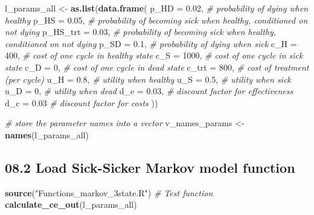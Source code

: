 \documentclass[
]{article}
\newenvironment{Shaded}{\begin{snugshade}}{\end{snugshade}}
\newcommand{\CommentTok}[1]{\textcolor[rgb]{0.56,0.35,0.01}{\textit{#1}}}
\newcommand{\DataTypeTok}[1]{\textcolor[rgb]{0.13,0.29,0.53}{#1}}
\newcommand{\DecValTok}[1]{\textcolor[rgb]{0.00,0.00,0.81}{#1}}
\newcommand{\FloatTok}[1]{\textcolor[rgb]{0.00,0.00,0.81}{#1}}
\newcommand{\KeywordTok}[1]{\textcolor[rgb]{0.13,0.29,0.53}{\textbf{#1}}}
\newcommand{\NormalTok}[1]{#1}
\newcommand{\StringTok}[1]{\textcolor[rgb]{0.31,0.60,0.02}{#1}}
\begin{document}
\begin{Shaded}
\begin{Highlighting}[]
\NormalTok{l_params_all <-}\StringTok{ }\KeywordTok{as.list}\NormalTok{(}\KeywordTok{data.frame}\NormalTok{(}
  \DataTypeTok{p_HD     =} \FloatTok{0.02}\NormalTok{,  }\CommentTok{# probability of dying when healthy}
  \DataTypeTok{p_HS     =} \FloatTok{0.05}\NormalTok{,  }\CommentTok{# probability of becoming sick when healthy, conditioned on not dying}
  \DataTypeTok{p_HS_trt =} \FloatTok{0.03}\NormalTok{,  }\CommentTok{# probability of becoming sick when healthy, conditioned on not dying}
  \DataTypeTok{p_SD     =} \FloatTok{0.1}\NormalTok{,   }\CommentTok{# probability of dying when sick}
  \DataTypeTok{c_H      =} \DecValTok{400}\NormalTok{,   }\CommentTok{# cost of one cycle in healthy state}
  \DataTypeTok{c_S      =} \DecValTok{1000}\NormalTok{,  }\CommentTok{# cost of one cycle in sick state}
  \DataTypeTok{c_D      =} \DecValTok{0}\NormalTok{,     }\CommentTok{# cost of one cycle in dead state}
  \DataTypeTok{c_trt    =} \DecValTok{800}\NormalTok{,   }\CommentTok{# cost of treatment (per cycle)}
  \DataTypeTok{u_H      =} \FloatTok{0.8}\NormalTok{,   }\CommentTok{# utility when healthy }
  \DataTypeTok{u_S      =} \FloatTok{0.5}\NormalTok{,   }\CommentTok{# utility when sick}
  \DataTypeTok{u_D      =} \DecValTok{0}\NormalTok{,     }\CommentTok{# utility when dead}
  \DataTypeTok{d_e      =} \FloatTok{0.03}\NormalTok{,  }\CommentTok{# discount factor for effectiveness}
  \DataTypeTok{d_c      =} \FloatTok{0.03}   \CommentTok{# discount factor for costs}
\NormalTok{))}

\CommentTok{# store the parameter names into a vector}
\NormalTok{v_names_params <-}\StringTok{ }\KeywordTok{names}\NormalTok{(l_params_all)}
\end{Highlighting}
\end{Shaded}

\hypertarget{load-sick-sicker-markov-model-function}{%
\subsection{08.2 Load Sick-Sicker Markov model
function}\label{load-sick-sicker-markov-model-function}}

\begin{Shaded}
\begin{Highlighting}[]
\KeywordTok{source}\NormalTok{(}\StringTok{"Functions_markov_3state.R"}\NormalTok{)}
\CommentTok{# Test function}
\KeywordTok{calculate_ce_out}\NormalTok{(l_params_all)}
\end{Highlighting}
\end{Shaded}
\end{document}
